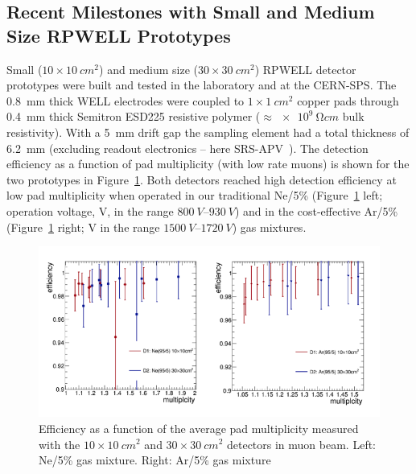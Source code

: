 \subsection{Recent Milestones with Small and Medium Size RPWELL Prototypes}
Small ($10\times \SI{10}{cm^2}$) and medium size ($30\times \SI{30}{cm^2}$) RPWELL detector prototypes were built and tested in the laboratory and at the CERN-SPS. The \SI{0.8}{mm} thick WELL electrodes were coupled to $1\times \SI{1}{cm^2}$ copper pads through \SI{0.4}{mm} thick Semitron ESD225 resistive polymer ($\approx \SI{e9}{\ohm cm}$ bulk resistivity). With a \SI{5}{mm} drift gap the sampling element had a total thickness of \SI{6.2}{mm} (excluding readout electronics -- here SRS-APV~\cite{1748-0221-8-03-C03015,French2001359}).
The detection efficiency as a function of pad multiplicity (with low rate muons) is shown for the two prototypes in Figure~\ref{fig:Calorimeter:THGEM:efficiencyVSMultiplicity}. Both detectors reached high detection efficiency at low pad multiplicity when operated in our traditional Ne/5\% (Figure~\ref{fig:Calorimeter:THGEM:efficiencyVSMultiplicity} left; operation voltage, V, in the range $\SIrange{800}{930}{V}$) and in the cost-effective Ar/5\% (Figure~\ref{fig:Calorimeter:THGEM:efficiencyVSMultiplicity} right; V in the range $\SIrange{1500}{1720}{V}$) gas mixtures.
\begin{figure}
	\centering
	\includegraphics[width=.9\textwidth]{Calorimeter/THGEM/efficiencyVSMultiplicity.png}
	\caption{Efficiency as a function of the average pad multiplicity measured with the $10\times \SI{10}{cm^2}$ and $30\times \SI{30}{cm^2}$ detectors in muon beam. Left: Ne/5\% gas mixture. Right: Ar/5\% gas mixture}
	\label{fig:Calorimeter:THGEM:efficiencyVSMultiplicity}
\end{figure}
